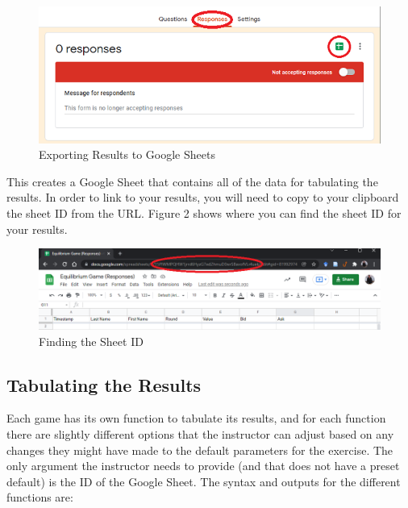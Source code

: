 \documentclass[
]{article}
\begin{document}
\begin{figure}
\centering
\includegraphics{Figure1.png}
\caption{Exporting Results to Google Sheets}
\end{figure}

This creates a Google Sheet that contains all of the data for tabulating
the results. In order to link to your results, you will need to copy to
your clipboard the sheet ID from the URL. Figure 2 shows where you can
find the sheet ID for your results.

\begin{figure}
\centering
\includegraphics{Figure2.png}
\caption{Finding the Sheet ID}
\end{figure}

\hypertarget{tabulating-the-results}{%
\subsection{Tabulating the Results}\label{tabulating-the-results}}

Each game has its own function to tabulate its results, and for each
function there are slightly different options that the instructor can
adjust based on any changes they might have made to the default
parameters for the exercise. The only argument the instructor needs to
provide (and that does not have a preset default) is the ID of the
Google Sheet. The syntax and outputs for the different functions are:
\end{document}
